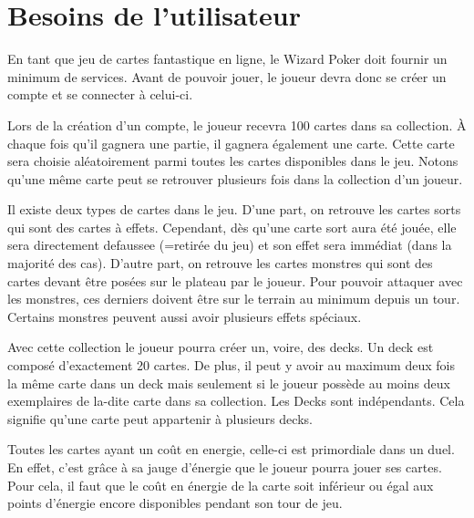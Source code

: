 \documentclass[11pt,a4paper]{article}
\begin{document}
\section{Besoins de l'utilisateur}
\label{sec:besoins}

En tant que jeu de cartes fantastique en ligne, le Wizard Poker doit fournir un minimum de services. Avant de pouvoir jouer, le joueur devra donc se créer un compte et se connecter à celui-ci.

\medbreak

Lors de la création d'un compte, le joueur recevra 100 cartes dans sa \gls{collection}.  À chaque fois qu'il gagnera une partie, il gagnera également une carte.  Cette carte sera choisie aléatoirement parmi toutes les cartes disponibles dans le jeu.  Notons qu'une même carte peut se retrouver plusieurs fois dans la \gls{collection} d'un joueur.

\medbreak
{}
Il existe deux types de \gls{carte}s dans le jeu. D'une part, on retrouve les cartes \gls{sort}s qui sont des cartes à effets. Cependant, dès qu'une carte \gls{sort} aura été jouée, elle sera directement \gls{defausse}e (=retirée du jeu) et son effet sera immédiat (dans la majorité des cas). D'autre part, on retrouve les cartes \gls{monstre}s qui sont des cartes devant être posées sur le plateau par le joueur. Pour pouvoir attaquer avec les monstres, ces derniers doivent être sur le terrain au minimum depuis un tour. Certains monstres peuvent aussi avoir plusieurs effets spéciaux.

\medbreak

Avec cette \gls{collection} le joueur pourra créer un, voire, des \gls{deck}s.  Un \gls{deck} est composé d'exactement 20 cartes.  De plus, il peut y avoir au maximum deux fois la même carte dans un \gls{deck} mais seulement si le joueur possède au moins deux exemplaires de la-dite carte dans sa \gls{collection}.  Les Decks sont indépendants.  Cela signifie qu'une carte peut appartenir à plusieurs decks.

\medbreak

Toutes les cartes ayant un coût en \gls{energie}, celle-ci est primordiale dans un duel. En effet, c'est grâce à sa jauge d'énergie que le joueur pourra jouer ses cartes. Pour cela, il faut que le coût en énergie de la carte soit inférieur ou égal aux points d'énergie encore disponibles pendant son tour de jeu.

\medbreak
\end{document}
